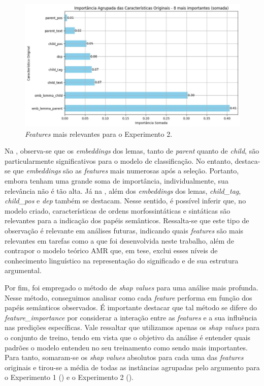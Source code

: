 \begin{figure}[h]
  \centering
  \begin{minipage}{.75\textwidth}
  \includegraphics[width=\textwidth]{figure07.jpg}
  \caption{\emph{Features} mais relevantes para o Experimento 2.}
  \label{fig-07}
  \end{minipage}
\end{figure}


Na , observa-se que os \emph{embeddings} dos lemas, tanto de
\emph{parent} quanto de \emph{child}, são particularmente significativos
para o modelo de classificação. No entanto, destaca-se que
\emph{embeddings} são as \emph{features} mais numerosas após a seleção.
Portanto, embora tenham uma grande soma de importância, individualmente,
sua relevância não é tão alta. Já na , além dos
\emph{embeddings} dos lemas, \emph{child\_tag}, \emph{child\_pos} e
\emph{dep} também se destacam. Nesse sentido, é possível inferir que, no
modelo criado, características de ordens morfossintáticas e sintáticas
são relevantes para a indicação dos papéis semânticos. Ressalta-se que
este tipo de observação é relevante em análises futuras, indicando quais
\emph{features} são mais relevantes em tarefas como a que foi
desenvolvida neste trabalho, além de contrapor o modelo teórico AMR que,
em tese, exclui esses níveis de conhecimento linguístico na
representação do significado e de sua estrutura argumental.

Por fim, foi empregado o método de \emph{shap values} para uma análise
mais profunda. Nesse método, conseguimos analisar como cada
\emph{feature} performa em função dos papéis semânticos observados. É
importante destacar que tal método se difere do
\emph{feature\_importance} por considerar a interação entre as
\emph{features} e a sua influência nas predições específicas. Vale
ressaltar que utilizamos apenas os \emph{shap values} para o conjunto de
treino, tendo em vista que o objetivo da análise é entender quais
padrões o modelo entendeu no seu treinamento como sendo mais
importantes. Para tanto, somaram-se os \emph{shap values} absolutos para
cada uma das \emph{features} originais e tirou-se a média de todas as
instâncias agrupadas pelo argumento para o Experimento 1 () e o Experimento 2 ().

